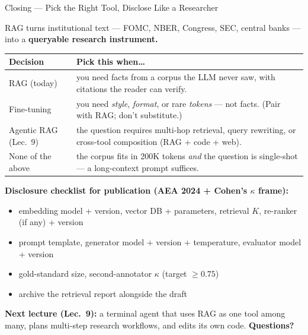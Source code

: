 \begin{frame}{Closing --- Pick the Right Tool, Disclose Like a Researcher}
\begin{center}\large
RAG turns institutional text --- FOMC, NBER, Congress, SEC, central banks --- into a \textbf{queryable research instrument.}
\end{center}

\vspace{0.15cm}
\small
\begin{tabular}{p{2.7cm}p{8.9cm}}
\toprule
\textbf{Decision} & \textbf{Pick this when\dots} \\
\midrule
RAG (today)            & you need facts from a corpus the LLM never saw, with citations the reader can verify. \\
Fine-tuning            & you need \emph{style}, \emph{format}, or rare \emph{tokens} --- not facts. (Pair with RAG; don't substitute.) \\
Agentic RAG (Lec.\ 9)   & the question requires multi-hop retrieval, query rewriting, or cross-tool composition (RAG + code + web). \\
None of the above      & the corpus fits in 200K tokens \emph{and} the question is single-shot --- a long-context prompt suffices. \\
\bottomrule
\end{tabular}

\vspace{0.25cm}
\textbf{Disclosure checklist for publication (AEA 2024 + Cohen's $\kappa$ frame):}
\begin{itemize}\small
\item embedding model + version, vector DB + parameters, retrieval $K$, re-ranker (if any) + version
\item prompt template, generator model + version + temperature, evaluator model + version
\item gold-standard size, second-annotator $\kappa$ (target $\geq 0.75$)
\item archive the retrieval report alongside the draft
\end{itemize}

\vspace{0.1cm}
\centering\textbf{Next lecture (Lec.\ 9):} a terminal agent that uses RAG as one tool among many, plans multi-step research workflows, and edits its own code. \textbf{Questions?}
\end{frame}


